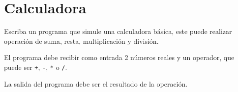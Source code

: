 \section{Calculadora}

Escriba un programa que simule una calculadora básica, este puede
realizar operación de suma, resta, multiplicación y división.

El programa debe recibir como entrada 2 números reales y un operador,
que puede ser \lstinline!+!, \lstinline!-!, \lstinline!*! o
\lstinline!/!.

La salida del programa debe ser el resultado de la operación.
